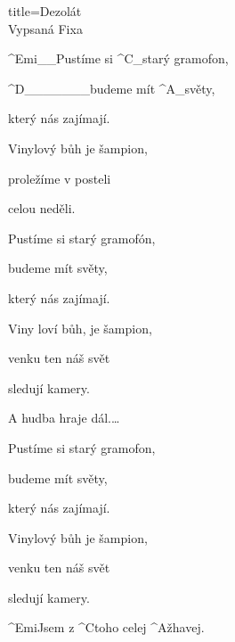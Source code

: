 \begin{song}{title=\centering Dezolát\\\normalsize Vypsaná Fixa \vspace*{-0.3cm}}
{\begin{minipage}[t]{0.48\textwidth}
	^{Emi{\color{white}\_\_}}Pustíme si ^{C{\color{white}\_}}starý gramofon, 
	
	^{D{\color{white}\_\_\_\_\_\_\_}}budeme mít ^{A{\color{white}\_}}světy, 
	
	který nás zajímají.
	
	Vinylový bůh je šampion,
	
	proležíme v posteli 
	
	celou neděli.
	
	Pustíme si starý gramofón,
	
	budeme mít světy,
	
	který nás zajímají.
	
	Viny loví bůh, je šampion,
	
	venku ten náš svět 
	
	sledují kamery.
	
	\phantom{h}
	
	A hudba hraje dál.\elipsa\dots
	
	\phantom{h}	
	
	Pustíme si starý gramofon,
	
	budeme mít světy, 
	
	který nás zajímají.
	
	Vinylový bůh je šampion,
	
	venku ten náš svět 
	
	sledují kamery.
	
	\phantom{j}
	
	^{Emi}Jsem z ^{C}toho celej ^{A}žhavej.
	
	
\end{minipage}
}
\setcounter{Slokočet}{0}
\end{song}



